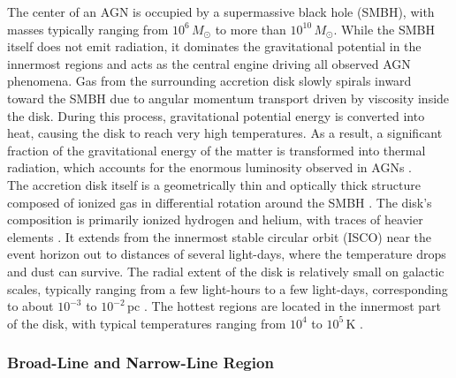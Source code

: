 The center of an AGN is occupied by a supermassive black hole (SMBH), with masses typically ranging from $10^6\,M_\odot$ to more than $10^{10}\,M_\odot$. While the SMBH itself does not emit radiation, it dominates the gravitational potential in the innermost regions and acts as the central engine driving all observed AGN phenomena. Gas from the surrounding accretion disk slowly spirals inward toward the SMBH due to angular momentum transport driven by viscosity inside the disk. During this process, gravitational potential energy is converted into heat, causing the disk to reach very high temperatures. As a result, a significant fraction of the gravitational energy of the matter is transformed into thermal radiation, which accounts for the enormous luminosity observed in AGNs \parencite{netzer2013agn}.\\
The accretion disk itself is a geometrically thin and optically thick structure composed of ionized gas in differential rotation around the SMBH \parencite{shakura1973black}. The disk's composition is primarily ionized hydrogen and helium, with traces of heavier elements \parencite{netzer2013agn}. It extends from the innermost stable circular orbit (ISCO) near the event horizon out to distances of several light-days, where the temperature drops and dust can survive. The radial extent of the disk is relatively small on galactic scales, typically ranging from a few light-hours to a few light-days, corresponding to about $10^{-3}$ to $10^{-2}$\,pc \parencite{netzer2013agn,hickox2018obscured}.  The hottest regions are located in the innermost part of the disk, with typical temperatures ranging from $10^4$ to $10^5$\,K \parencite{hickox2018obscured}. 


\subsubsection{Broad-Line and Narrow-Line Region}

